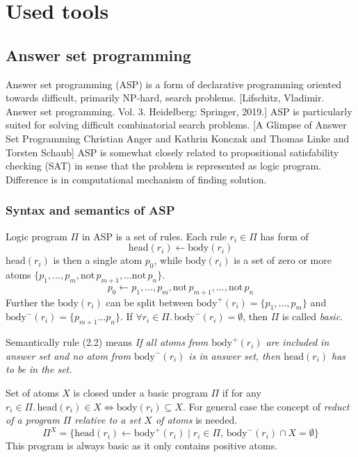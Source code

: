 \documentclass{fithesis}
\newcommand{\asprule}[2]{#1 \leftarrow #2}
\newcommand{\aspnot}{\mathrm{not}\,}
\newcommand{\asphead}{\mathrm{head}}
\newcommand{\aspbody}{\mathrm{body}}
\begin{document}
\chapter{Used tools}

\section{Answer set programming}

Answer set programming (ASP) is a form of declarative
programming oriented towards difficult, primarily NP-hard,
search problems. [Lifschitz, Vladimir. Answer set programming. Vol. 3.
Heidelberg: Springer, 2019.]
ASP is particularly suited for solving difficult combinatorial search problems.
[A Glimpse of Answer Set Programming
Christian Anger and Kathrin Konczak and Thomas Linke and Torsten Schaub]
ASP is somewhat closely related to propositional
satisfability checking (SAT)
in sense that the problem is represented as logic program. Difference is in
computational mechanism of finding solution.

\subsection{Syntax and semantics of ASP}

Logic program $\Pi$ in ASP is a set of rules. Each rule $r_i\in \Pi$ has form of
\begin{equation}
    \asprule{\asphead(r_i)}{\aspbody(r_i)}
\end{equation}
$\asphead(r_i)$ is then a single atom $p_0$, while $\aspbody(r_i)$ is a set of zero
or more atoms $\{p_1, \dots, p_m, \aspnot p_{m+1}, \dots \aspnot p_n\}$.
\begin{equation}
    \asprule{p_0}{p_1, \dots, p_m, \aspnot p_{m+1}, \dots, \aspnot p_n}
\end{equation}
Further the $\aspbody(r_i)$ can be split between
$\aspbody^+(r_i) = \{p_1, \dots, p_m\}$
and $\aspbody^-(r_i) = \{p_{m+1}\dots p_n\}$.
If $\forall r_i \in \Pi.\, \aspbody^-(r_i) = \emptyset$, then $\Pi$
is called \textit{basic}.

Semantically rule (2.2) means \textit{If all atoms from $\aspbody^+(r_i)$
are included in answer set and no atom from $\aspbody^-(r_i)$ is in answer set,
then $\asphead(r_i)$ has to be in the set.}

Set of atoms $X$ is closed under a basic program $\Pi$ if for any
$r_i\in \Pi.\,\asphead(r_i)\in X \iff \aspbody(r_i)\subseteq X$.
For general case the concept of \textit{reduct of a program $\Pi$ relative
to a set $X$ of atoms} is needed.
\begin{equation}
    \Pi^X = \{\asphead(r_i)\leftarrow\aspbody^+(r_i)
              \mid r_i\in \Pi,\,\aspbody^-(r_i)\cap X = \emptyset\}
\end{equation}
This program is always basic as it only contains positive atoms.
\end{document}
